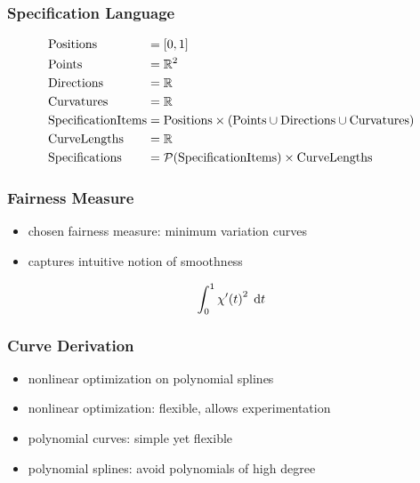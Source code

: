 \documentclass[mathserif]{beamer}
\begin{document}
		\begin{frame}
			\frametitle{Specification Language}
			\begin{equation*}
				\begin{alignedat}{2}
					& \mathrm{Positions}          && = \left[ 0,1 \right]\\
					& \mathrm{Points}             && = \mathbb{R}^{2}\\
					& \mathrm{Directions}         && = \mathbb{R}\\
					& \mathrm{Curvatures}         && = \mathbb{R}\\
					& \mathrm{SpecificationItems} && = \mathrm{Positions} \times \left(\mathrm{Points} \cup \mathrm{Directions} \cup \mathrm{Curvatures}\right)\\
					& \mathrm{CurveLengths}       && = \mathbb{R}\\
					& \mathrm{Specifications}     && = \mathcal{P}\!\left( \mathrm{SpecificationItems} \right) \times \mathrm{CurveLengths}
				\end{alignedat}
			\end{equation*}
		\end{frame}
		
		\begin{frame}
			\frametitle{Fairness Measure}
			\begin{itemize}
				\item chosen fairness measure: minimum variation curves
				\item captures intuitive notion of smoothness
			\end{itemize}
			 \begin{equation*}
				 \int_{0}^{1} \chi'\!\left( t \right)^2 \; \mathrm{d}t
			 \end{equation*}
		\end{frame}
		
		\begin{frame}
			\frametitle{Curve Derivation}
			\begin{itemize}
				\item nonlinear optimization on polynomial splines %
				\item nonlinear optimization: flexible, allows experimentation
				\item polynomial curves: simple yet flexible %
				\item polynomial splines: avoid polynomials of high degree
			\end{itemize}
		\end{frame}
		
\end{document}
